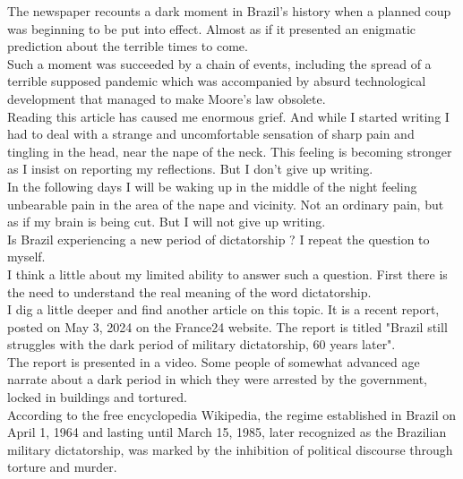 \documentclass[11pt]{book}
\begin{document}
\noindent The newspaper recounts a dark moment in Brazil's history when a planned coup was beginning to be put into effect. Almost as if it presented an enigmatic prediction about the terrible times to come. \\

\noindent Such a moment was succeeded by a chain of events, including the spread of a terrible supposed pandemic which was accompanied by absurd technological development that managed to make Moore's law obsolete. \\

\noindent Reading this article has caused me enormous grief. And while I started writing I had to deal with a strange and uncomfortable sensation of sharp pain and tingling in the head, near the nape of the neck. This feeling is becoming stronger as I insist on reporting my reflections. But I don't give up writing. \\

\noindent In the following days I will be waking up in the middle of the night feeling unbearable pain in the area of the nape and vicinity. Not an ordinary pain, but as if my brain is being cut. But I will not give up writing. \\

\noindent Is Brazil experiencing a new period of dictatorship ? I repeat the question to myself. \\

\noindent I think a little about my limited ability to answer such a question. First there is the need to understand the real meaning of the word dictatorship. \\

\noindent I dig a little deeper and find another article on this topic. It is a recent report, posted on May 3, 2024 on the France24 website. The report is titled "Brazil still struggles with the dark period of military dictatorship, 60 years later". \\

\noindent The report is presented in a video. Some people of somewhat advanced age narrate about a dark period in which they were arrested by the government, locked in buildings and tortured. \\

\noindent According to the free encyclopedia Wikipedia, the regime established in Brazil on April 1, 1964 and lasting until March 15, 1985, later recognized as the Brazilian military dictatorship, was marked by the inhibition of political discourse through torture and murder.
\end{document}
